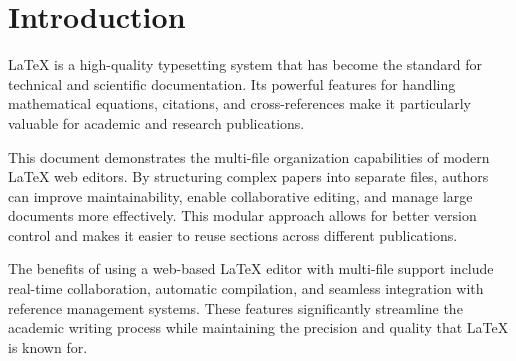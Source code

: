 \section{Introduction}

LaTeX is a high-quality typesetting system that has become the standard for technical and scientific documentation. Its powerful features for handling mathematical equations, citations, and cross-references make it particularly valuable for academic and research publications.

This document demonstrates the multi-file organization capabilities of modern LaTeX web editors. By structuring complex papers into separate files, authors can improve maintainability, enable collaborative editing, and manage large documents more effectively. This modular approach allows for better version control and makes it easier to reuse sections across different publications.

The benefits of using a web-based LaTeX editor with multi-file support include real-time collaboration, automatic compilation, and seamless integration with reference management systems. These features significantly streamline the academic writing process while maintaining the precision and quality that LaTeX is known for.
